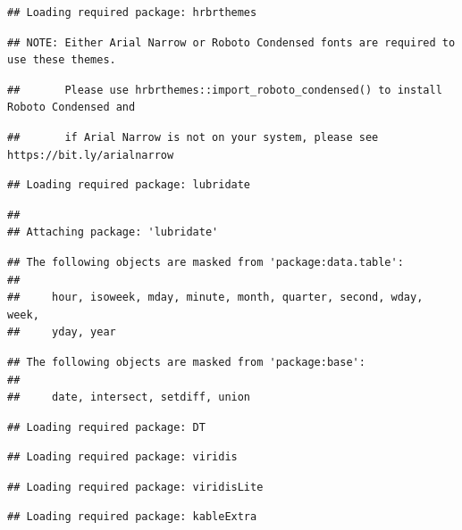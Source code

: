 \documentclass[
]{book}
\begin{document}
\begin{verbatim}
## Loading required package: hrbrthemes
\end{verbatim}

\begin{verbatim}
## NOTE: Either Arial Narrow or Roboto Condensed fonts are required to use these themes.
\end{verbatim}

\begin{verbatim}
##       Please use hrbrthemes::import_roboto_condensed() to install Roboto Condensed and
\end{verbatim}

\begin{verbatim}
##       if Arial Narrow is not on your system, please see https://bit.ly/arialnarrow
\end{verbatim}

\begin{verbatim}
## Loading required package: lubridate
\end{verbatim}

\begin{verbatim}
## 
## Attaching package: 'lubridate'
\end{verbatim}

\begin{verbatim}
## The following objects are masked from 'package:data.table':
## 
##     hour, isoweek, mday, minute, month, quarter, second, wday, week,
##     yday, year
\end{verbatim}

\begin{verbatim}
## The following objects are masked from 'package:base':
## 
##     date, intersect, setdiff, union
\end{verbatim}

\begin{verbatim}
## Loading required package: DT
\end{verbatim}

\begin{verbatim}
## Loading required package: viridis
\end{verbatim}

\begin{verbatim}
## Loading required package: viridisLite
\end{verbatim}

\begin{verbatim}
## Loading required package: kableExtra
\end{verbatim}
\end{document}
